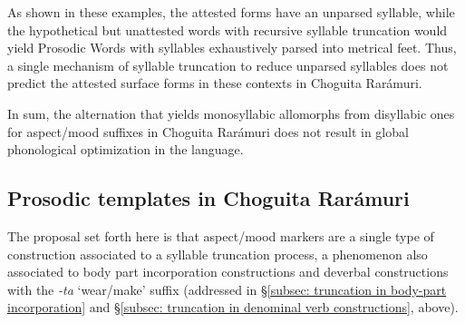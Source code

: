 \ea\label{ex: no truncation with multiple affixation}

    \z
\z

As shown in these examples, the attested forms have an unparsed syllable, while the hypothetical but unattested words with recursive syllable truncation would yield Prosodic Words with syllables exhaustively parsed into metrical feet. Thus, a single mechanism of syllable truncation to reduce unparsed syllables does not predict the attested surface forms in these contexts in Choguita Rarámuri.

In sum, the alternation that yields monosyllabic allomorphs from disyllabic ones for aspect/mood suffixes in Choguita Rarámuri does not result in global phonological optimization in the language.

\subsection{Prosodic templates in Choguita Rarámuri}
\label{subsec: prosodic templates in CR}

The proposal set forth here is that aspect/mood markers are a single type of construction associated to a syllable truncation process, a phenomenon also associated to body part incorporation constructions and deverbal constructions with the \textit{-ta} `wear/make' suffix (addressed in §\ref{subsec: truncation in body-part incorporation} and §\ref{subsec: truncation in denominal verb constructions}, above).

